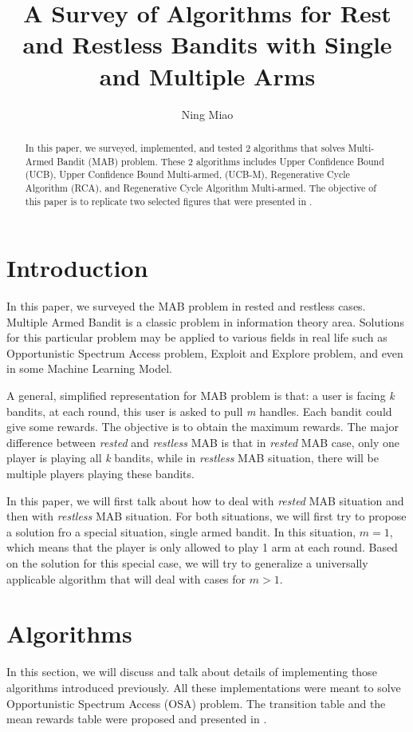 \documentclass{article}
\title{A Survey of Algorithms for Rest and Restless Bandits with Single and Multiple Arms}
\author{Ning Miao}
\begin{document}
\maketitle

\begin{abstract}
In this paper, we surveyed, implemented, and tested 2 algorithms that solves Multi-Armed Bandit (MAB) problem. These 2 algorithms includes Upper Confidence Bound (UCB), Upper Confidence Bound Multi-armed, (UCB-M), Regenerative Cycle Algorithm (RCA), and Regenerative Cycle Algorithm Multi-armed. The objective of this paper is to replicate two selected figures that were presented in \cite{6200864}. 
\end{abstract}

\section{Introduction}
In this paper, we surveyed the MAB problem in rested and restless cases. Multiple Armed Bandit is a classic problem in information theory area. Solutions for this particular problem may be applied to various fields in real life such as Opportunistic Spectrum Access problem, Exploit and Explore problem, and even in some Machine Learning Model.

A general, simplified representation for MAB problem is that: a user is facing \textit{k} bandits, at each round, this user is asked to pull \textit{m} handles. Each bandit could give some rewards. The objective is to obtain the maximum rewards. The major difference between \textit{rested} and \textit{restless} MAB is that in \textit{rested} MAB case, only one player is playing all \textit{k} bandits, while in \textit{restless} MAB situation, there will be multiple players playing these bandits.

In this paper, we will first talk about how to deal with \textit{rested} MAB situation and then with \textit{restless} MAB situation. For both situations, we will first try to propose a solution fro a special situation, single armed bandit. In this situation, $\textit{m}=1$, which means that the player is only allowed to play 1 arm at each round. Based on the solution for this special case, we will try to generalize a universally applicable algorithm that will deal with cases for $\textit{m}>1$.


\section{Algorithms}
In this section, we will discuss and talk about details of implementing those algorithms introduced previously. All these implementations were meant to solve Opportunistic Spectrum Access (OSA) problem. The transition table and the mean rewards table were proposed and presented in \cite{6200864}.
\end{document}
